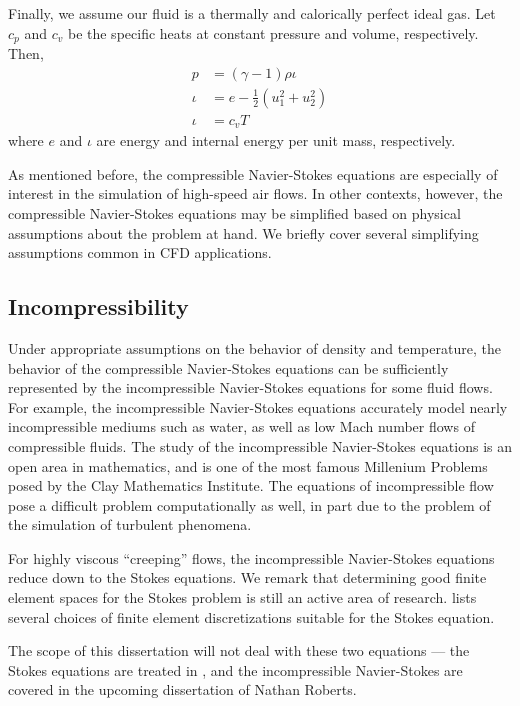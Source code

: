 Finally, we assume our fluid is a thermally and calorically perfect ideal gas. Let $c_p$ and $c_v$ be the specific heats at constant pressure and volume, respectively. Then,
\begin{align*}
p &= (\gamma-1)\rho\iota\\
\iota &= e-\frac{1}{2}(u_1^2+u_2^2)\\
\iota &= c_vT
\end{align*}
where $e$ and $\iota$ are energy and internal energy per unit mass, respectively. 

As mentioned before, the compressible Navier-Stokes equations are especially of interest in the simulation of high-speed air flows. In other contexts, however, the compressible Navier-Stokes equations may be simplified based on physical assumptions about the problem at hand. We briefly cover several simplifying assumptions common in CFD applications. 

\subsection{Incompressibility}

Under appropriate assumptions on the behavior of density and temperature, the behavior of the compressible Navier-Stokes equations can be sufficiently represented by the incompressible Navier-Stokes equations for some fluid flows.  For example, the incompressible Navier-Stokes equations accurately model nearly incompressible mediums such as water, as well as low Mach number flows of compressible fluids. The study of the incompressible Navier-Stokes equations is an open area in mathematics, and is one of the most famous Millenium Problems posed by the Clay Mathematics Institute. The equations of incompressible flow pose a difficult problem computationally as well, in part due to the problem of the simulation of turbulent phenomena. 

For highly viscous ``creeping'' flows, the incompressible Navier-Stokes equations reduce down to the Stokes equations. We remark that determining good finite element spaces for the Stokes problem is still an active area of research. \cite{stokesFEM} lists several choices of finite element discretizations suitable for the Stokes equation. 

The scope of this dissertation will not deal with these two equations --- the Stokes equations are treated in \cite{stokesDPG}, and the incompressible Navier-Stokes are covered in the upcoming dissertation of Nathan Roberts.  

